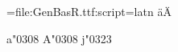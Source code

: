 
\font\test={file:GenBasR.ttf:script=latn}
\test ä\quad Ä

\test a\char"0308 %
\quad A\char"0308 %
\quad j\char"0323 %

\bye
